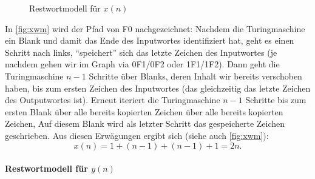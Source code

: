 \begin{figure}[hb]
    \caption{Restwortmodell für $x(n)$}
    \centering
    \label{fig:xwm}
\end{figure}
In \autoref{fig:xwm} wird der Pfad von F0 nachgezeichnet:
Nachdem die Turingmaschine ein Blank und damit das Ende des Inputwortes identifiziert hat,
geht es einen Schritt nach links, ``speichert'' sich das letzte Zeichen des Inputwortes
(je nachdem gehen wir im Graph via 0F1/0F2 oder 1F1/1F2).
Dann geht die Turingmaschine $n-1$ Schritte über Blanks, deren Inhalt wir bereits verschoben haben,
bis zum ersten Zeichen des Inputwortes (das gleichzeitig das letzte Zeichen des Outputwortes ist).
Erneut iteriert die Turingmaschine $n-1$ Schritte bis zum ersten Blank über alle bereits
kopierten Zeichen über alle bereits
kopierten Zeichen,
Auf diesem Blank wird als letzter Schritt das gespeicherte Zeichen geschrieben.
Aus diesen Erwägungen ergibt sich (siehe auch \autoref{fig:xwm}):
\[
    x(n) = 1 + (n-1) + (n-1) +1 = 2n.
\]
\paragraph{Restwortmodell für $y(n)$}

